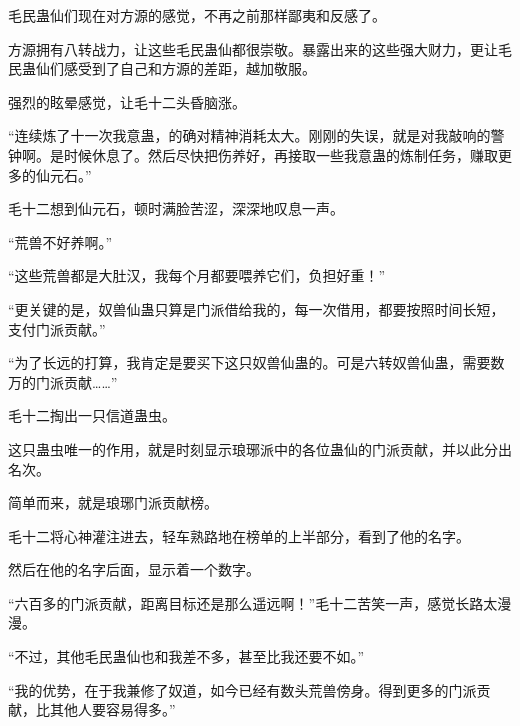 \begin{this_body}
毛民蛊仙们现在对方源的感觉，不再之前那样鄙夷和反感了。

方源拥有八转战力，让这些毛民蛊仙都很崇敬。暴露出来的这些强大财力，更让毛民蛊仙们感受到了自己和方源的差距，越加敬服。

强烈的眩晕感觉，让毛十二头昏脑涨。

“连续炼了十一次我意蛊，的确对精神消耗太大。刚刚的失误，就是对我敲响的警钟啊。是时候休息了。然后尽快把伤养好，再接取一些我意蛊的炼制任务，赚取更多的仙元石。”

毛十二想到仙元石，顿时满脸苦涩，深深地叹息一声。

“荒兽不好养啊。”

“这些荒兽都是大肚汉，我每个月都要喂养它们，负担好重！”

“更关键的是，奴兽仙蛊只算是门派借给我的，每一次借用，都要按照时间长短，支付门派贡献。”

“为了长远的打算，我肯定是要买下这只奴兽仙蛊的。可是六转奴兽仙蛊，需要数万的门派贡献……”

毛十二掏出一只信道蛊虫。

这只蛊虫唯一的作用，就是时刻显示琅琊派中的各位蛊仙的门派贡献，并以此分出名次。

简单而来，就是琅琊门派贡献榜。

毛十二将心神灌注进去，轻车熟路地在榜单的上半部分，看到了他的名字。

然后在他的名字后面，显示着一个数字。

“六百多的门派贡献，距离目标还是那么遥远啊！”毛十二苦笑一声，感觉长路太漫漫。

“不过，其他毛民蛊仙也和我差不多，甚至比我还要不如。”

“我的优势，在于我兼修了奴道，如今已经有数头荒兽傍身。得到更多的门派贡献，比其他人要容易得多。”

\end{this_body}

